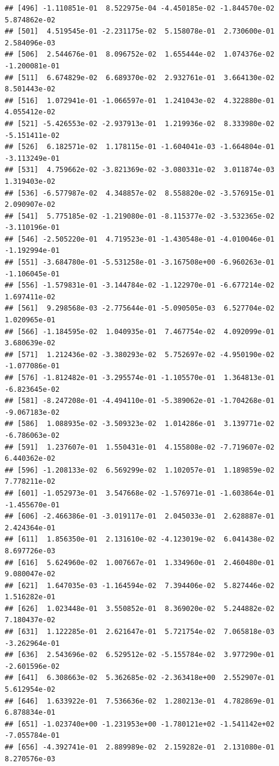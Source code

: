 \documentclass[
]{article}
\begin{document}
\begin{verbatim}
## [496] -1.110851e-01  8.522975e-04 -4.450185e-02 -1.844570e-02  5.874862e-02
## [501]  4.519545e-01 -2.231175e-02  5.158078e-01  2.730600e-01  2.584096e-03
## [506]  2.544676e-01  8.096752e-02  1.655444e-02  1.074376e-02 -1.200081e-01
## [511]  6.674829e-02  6.689370e-02  2.932761e-01  3.664130e-02  8.501443e-02
## [516]  1.072941e-01 -1.066597e-01  1.241043e-02  4.322880e-01  4.055412e-02
## [521] -5.426553e-02 -2.937913e-01  1.219936e-02  8.333980e-02 -5.151411e-02
## [526]  6.182571e-02  1.178115e-01 -1.604041e-03 -1.664804e-01 -3.113249e-01
## [531]  4.759662e-02 -3.821369e-02 -3.080331e-02  3.011874e-03  1.319403e-02
## [536] -6.577987e-02  4.348857e-02  8.558820e-02 -3.576915e-01  2.090907e-02
## [541]  5.775185e-02 -1.219080e-01 -8.115377e-02 -3.532365e-02 -3.110196e-01
## [546] -2.505220e-01  4.719523e-01 -1.430548e-01 -4.010046e-01 -1.192994e-01
## [551] -3.684780e-01 -5.531258e-01 -3.167508e+00 -6.960263e-01 -1.106045e-01
## [556] -1.579831e-01 -3.144784e-02 -1.122970e-01 -6.677214e-02  1.697411e-02
## [561]  9.298568e-03 -2.775644e-01 -5.090505e-03  6.527704e-02  1.020965e-01
## [566] -1.184595e-02  1.040935e-01  7.467754e-02  4.092099e-01  3.680639e-02
## [571]  1.212436e-02 -3.380293e-02  5.752697e-02 -4.950190e-02 -1.077086e-01
## [576] -1.812482e-01 -3.295574e-01 -1.105570e-01  1.364813e-01 -6.823645e-02
## [581] -8.247208e-01 -4.494110e-01 -5.389062e-01 -1.704268e-01 -9.067183e-02
## [586]  1.088935e-02 -3.509323e-02  1.014286e-01  3.139771e-02 -6.786063e-02
## [591]  1.237607e-01  1.550431e-01  4.155808e-02 -7.719607e-02  6.440362e-02
## [596] -1.208133e-02  6.569299e-02  1.102057e-01  1.189859e-02  7.778211e-02
## [601] -1.052973e-01  3.547668e-02 -1.576971e-01 -1.603864e-01 -1.455670e-01
## [606] -2.466386e-01 -3.019117e-01  2.045033e-01  2.628887e-01  2.424364e-01
## [611]  1.856350e-01  2.131610e-02 -4.123019e-02  6.041438e-02  8.697726e-03
## [616]  5.624960e-02  1.007667e-01  1.334960e-01  2.460480e-01  9.080047e-02
## [621]  1.647035e-03 -1.164594e-02  7.394406e-02  5.827446e-02  1.516282e-01
## [626]  1.023448e-01  3.550852e-01  8.369020e-02  5.244882e-02  7.180437e-02
## [631]  1.122285e-01  2.621647e-01  5.721754e-02  7.065818e-03 -3.262964e-01
## [636]  2.543696e-02  6.529512e-02 -5.155784e-02  3.977290e-01 -2.601596e-02
## [641]  6.308663e-02  5.362685e-02 -2.363418e+00  2.552907e-01  5.612954e-02
## [646]  1.633922e-01  7.536636e-02  1.280213e-01  4.782869e-01  6.878834e-01
## [651] -1.023740e+00 -1.231953e+00 -1.780121e+02 -1.541142e+02 -7.055784e-01
## [656] -4.392741e-01  2.889989e-02  2.159282e-01  2.131080e-01  8.270576e-03

\end{verbatim}
\end{document}
